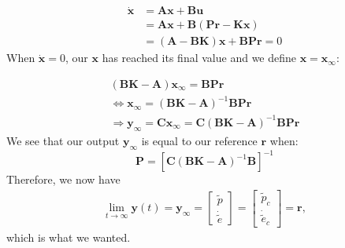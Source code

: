 \begin{align*}
  \dot{\boldsymbol{x}} &= \boldsymbol{Ax} + \boldsymbol{Bu} \\
                       &= \boldsymbol{Ax} +
                         \boldsymbol{B}(\boldsymbol{Pr} -
                         \boldsymbol{Kx}) \\
                       &= (\boldsymbol{A}-\boldsymbol{BK})\boldsymbol{x}
                         + \boldsymbol{BPr} = 0
\end{align*}
When $\boldsymbol{\dot{x}} = 0$, our $\boldsymbol{x}$ has reached its
final value and we define $\boldsymbol{x} = \boldsymbol{x_\infty}$:

\begin{align*}
  (\boldsymbol{BK} - \boldsymbol{A})\boldsymbol{x_\infty} = \boldsymbol{BPr} \\
  \Leftrightarrow \boldsymbol{x_\infty} = (\boldsymbol{BK} - \boldsymbol{A})^{-1}\boldsymbol{BPr} \\
  \Rightarrow \boldsymbol{y_\infty} = \boldsymbol{Cx_\infty} = \boldsymbol{C}(\boldsymbol{BK} - \boldsymbol{A})^{-1}\boldsymbol{BPr}
\end{align*}
We see that our output $\boldsymbol{y_\infty}$ is equal to our reference $\boldsymbol{r}$ when:
\begin{equation}
  \boldsymbol{P} = [\boldsymbol{C}(\boldsymbol{BK} - \boldsymbol{A})^{-1}\boldsymbol{B}]^{-1}
\end{equation}
Therefore, we now have
\begin{align*}
\lim_{t\to\infty}\boldsymbol{y}(t) = \boldsymbol{y_\infty} =
\begin{bmatrix}
\tilde{p} \\
\dot{\tilde{e}}
\end{bmatrix}
= 
\begin{bmatrix}
\tilde{p}_c \\
\dot{\tilde{e}}_c
\end{bmatrix}
= \boldsymbol{r},
\end{align*}
which is what we wanted.
